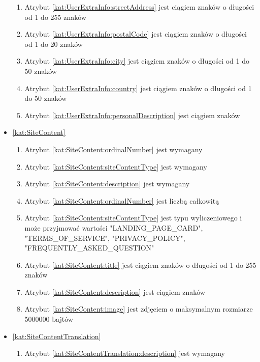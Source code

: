 \begin{itemize}[label={\textbf{Ograniczenia dla}}, wide, labelwidth=!, labelindent=0pt]
\begin{enumerate}[label={\textbf{OGR/\protect\threedigits{\arabic{enumi}}}}, wide, labelwidth=!, align=left, leftmargin=3cm, resume]
        \item Atrybut \ref{kat:UserExtraInfo:streetAddress} jest ciągiem znaków o długości od 1 do 255 znaków
        \item Atrybut \ref{kat:UserExtraInfo:postalCode} jest ciągiem znaków o długości od 1 do 20 znaków
        \item Atrybut \ref{kat:UserExtraInfo:city} jest ciągiem znaków o długości od 1 do 50 znaków
        \item Atrybut \ref{kat:UserExtraInfo:country} jest ciągiem znaków o długości od 1 do 50 znaków
        \item Atrybut \ref{kat:UserExtraInfo:personalDescription} jest ciągiem znaków
    \end{enumerate}

    \item\ref{kat:SiteContent}
    \begin{enumerate}[label={\textbf{OGR/\protect\threedigits{\arabic{enumi}}}}, wide, labelwidth=!, align=left, leftmargin=3cm, resume]
        \item Atrybut \ref{kat:SiteContent:ordinalNumber} jest wymagany
        \item Atrybut \ref{kat:SiteContent:siteContentType} jest wymagany
        \item Atrybut \ref{kat:SiteContent:description} jest wymagany

        \item Atrybut \ref{kat:SiteContent:ordinalNumber} jest liczbą całkowitą
        \item Atrybut \ref{kat:SiteContent:siteContentType} jest typu wyliczeniowego i może przyjmować wartości "LANDING\_PAGE\_CARD", "TERMS\_OF\_SERVICE", "PRIVACY\_POLICY", "FREQUENTLY\_ASKED\_QUESTION"
        \item Atrybut \ref{kat:SiteContent:title} jest ciągiem znaków o długości od 1 do 255 znaków
        \item Atrybut \ref{kat:SiteContent:description} jest ciągiem znaków
        \item Atrybut \ref{kat:SiteContent:image} jest zdjęciem o maksymalnym rozmiarze 5000000 bajtów
    \end{enumerate}

    \item\ref{kat:SiteContentTranslation}
    \begin{enumerate}[label={\textbf{OGR/\protect\threedigits{\arabic{enumi}}}}, wide, labelwidth=!, align=left, leftmargin=3cm, resume]
        \item Atrybut \ref{kat:SiteContentTranslation:description} jest wymagany


\end{enumerate}
\end{itemize}
